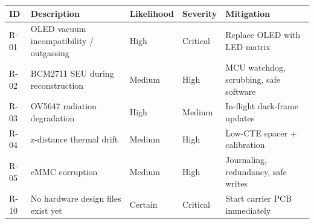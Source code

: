 \begin{longtable}{L{1.5cm}L{6.2cm}L{2cm}L{2cm}L{4cm}}
\toprule
\textbf{ID} & \textbf{Description} & \textbf{Likelihood} & \textbf{Severity} & \textbf{Mitigation} \\
\midrule
R-01 & OLED vacuum incompatibility / outgassing & High & Critical & Replace OLED with LED matrix \\
R-02 & BCM2711 SEU during reconstruction & Medium & High & MCU watchdog, scrubbing, safe software \\
R-03 & OV5647 radiation degradation & High & Medium & In-flight dark-frame updates \\
R-04 & z-distance thermal drift & Medium & High & Low-CTE spacer + calibration \\
R-05 & eMMC corruption & Medium & High & Journaling, redundancy, safe writes \\
R-10 & No hardware design files exist yet & Certain & Critical & Start carrier PCB immediately \\
\bottomrule
\end{longtable}
